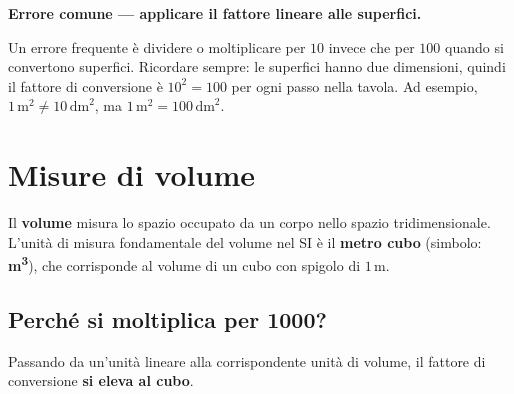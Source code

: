 \begin{attenzione}
    \textbf{Errore comune — applicare il fattore lineare alle superfici.}

    Un errore frequente è dividere o moltiplicare per $10$ invece che per $100$ quando si convertono superfici. Ricordare sempre: le superfici hanno due dimensioni, quindi il fattore di conversione è $10^2 = 100$ per ogni passo nella tavola. Ad esempio, $1\,\text{m}^2 \neq 10\,\text{dm}^2$, ma $1\,\text{m}^2 = 100\,\text{dm}^2$.
\end{attenzione}

\section{Misure di volume}

\begin{definizione}
    Il \textbf{volume} misura lo spazio occupato da un corpo nello spazio tridimensionale. L'unità di misura fondamentale del volume nel SI è il \textbf{metro cubo} (simbolo: \textbf{m\textsuperscript{3}}), che corrisponde al volume di un cubo con spigolo di $1\,\text{m}$.
\end{definizione}

\subsection{Perché si moltiplica per 1000?}

Passando da un'unità lineare alla corrispondente unità di volume, il fattore di conversione \textbf{si eleva al cubo}.

\begin{center}
\end{center}

